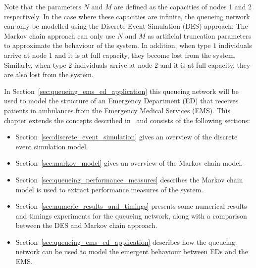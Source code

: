 Note that the parameters \(N\) and \(M\) are defined as the capacities of nodes
1 and 2 respectively.
In the case where these capacities are infinite, the queueing network can only
be modelled using the Discrete Event Simulation (DES) approach.
The Markov chain approach can only use \(N\) and \(M\) as artificial truncation
parameters to approximate the behaviour of the system.
In addition, when type \(1\) individuals arrive at node \(1\) and it is at full
capacity, they become lost from the system.
Similarly, when type \(2\) individuals arrive at node \(2\) and it is at full
capacity, they are also lost from the system.

In Section~\ref{sec:queueing_ems_ed_application} this queueing network will be
used to model the structure of an Emergency Department (ED) that receives
patients in ambulances from the Emergency Medical Services (EMS).
This chapter extends the concepts described in~\cite{panayides2023game} and
consists of the following sections:

\begin{itemize}
    \item Section~\ref{sec:discrete_event_simulation} gives an overview of
    the discrete event simulation model.
    \item Section~\ref{sec:markov_model} gives an overview of the Markov
    chain model.
    \item Section~\ref{sec:queueing_performance_measures} describes the Markov
    chain model is used to extract performance measures of the system.
    \item Section~\ref{sec:numeric_results_and_timings} presents some numerical
    results and timings experiments for the queueing network, along with
    a comparison between the DES and Markov chain approach.
    \item Section~\ref{sec:queueing_ems_ed_application} describes how the
    queueing network can be used to model the emergent behaviour between
    EDs and the EMS.
\end{itemize}












